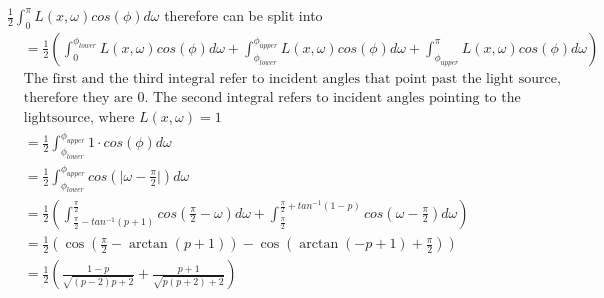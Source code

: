 \documentclass[a4paper]{scrartcl}
\begin{document}
    $ \frac{1}{2}\int_{0}^\pi L(x,\omega)cos(\phi)d\omega$ therefore can be split into 
    \begin{align*}
      &=\frac{1}{2}(\int_{0}^{\phi_{lower}} L(x,\omega)cos(\phi)d\omega + \int_{\phi_{lower}}^{\phi_{upper}} L(x,\omega)cos(\phi)d\omega + \int_{\phi_{upper}}^{\pi} L(x,\omega)cos(\phi)d\omega)\\
      &\text{The first and the third integral refer to incident angles that point past the light source, } \\
      &\text{therefore they are 0. The second integral refers to incident angles pointing to the } \\
      &\text{lightsource, where } L(x,\omega) = 1\\
      &=\frac{1}{2} \int_{\phi_{lower}}^{\phi_{upper}} 1\cdot cos(\phi)d\omega\\
      &=\frac{1}{2} \int_{\phi_{lower}}^{\phi_{upper}} cos(\lvert \omega - \frac{\pi}{2} \rvert)d\omega \\
      &=\frac{1}{2} \left( \int_{\frac{\pi}{2} - tan^{-1}(p+1)}^{\frac{\pi}{2}} cos(\frac{\pi}{2} - \omega )d\omega +  \int_{\frac{\pi}{2}}^{\frac{\pi}{2} + tan^{-1}(1-p)}cos(\omega - \frac{\pi}{2} )d\omega\right)\\
      &= \frac{1}{2}\left(\cos \left(\frac{\pi }{2}-\arctan \left(p+1\right)\right)-\cos \left(\arctan \left(-p+1\right)+\frac{\pi }{2}\right)\right) \\
      &= \frac{1}{2}\left( \frac{1-p}{\sqrt{(p-2)p + 2}} + \frac{p+1}{\sqrt{p(p+2) + 2}} \right)
    \end{align*}


  
\end{document}
